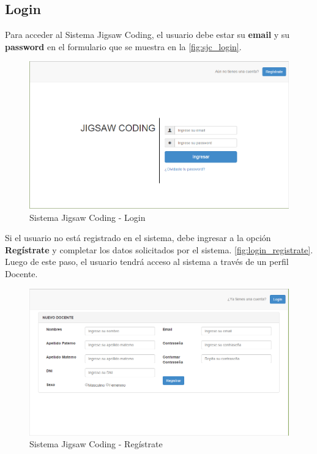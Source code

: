 \subsection{Login} 
Para acceder al Sistema Jigsaw Coding, el usuario debe estar su \textbf{email} y su \textbf{password} en el formulario que se muestra en la \autoref{fig:sjc_login}.

\begin{figure}[h!]
	\centering
	\caption[SJC Login]{Sistema Jigsaw Coding - Login}
	\label{fig:sjc_login}
	\includegraphics[scale=0.4]{figuras/usodelsistema/login}	
\end{figure}

Si el usuario no está registrado en el sistema, debe ingresar a la opción \textbf{Regístrate} y completar los datos solicitados por el sistema. \autoref{fig:login_registrate}. Luego de este paso, el usuario tendrá acceso al sistema a través de un perfil Docente.\\

\begin{figure}[h!]
	\centering
	\caption[SJC Registrate]{Sistema Jigsaw Coding - Regístrate}
	\label{fig:login_registrate}
	\includegraphics[scale=0.5]{figuras/usodelsistema/login_registrate}	
\end{figure}

